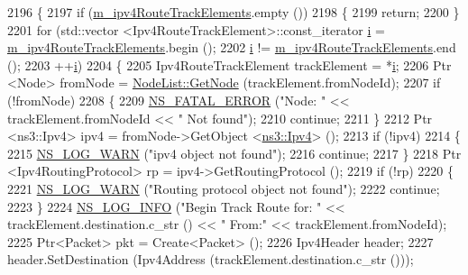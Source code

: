 \begin{DoxyCode}
2196 \{
2197   \textcolor{keywordflow}{if} (\hyperlink{classns3_1_1AnimationInterface_ae34a5934529aba007040aca4fe7ca0fb}{m\_ipv4RouteTrackElements}.empty ())
2198     \{
2199       \textcolor{keywordflow}{return};
2200     \}
2201   \textcolor{keywordflow}{for} (std::vector <Ipv4RouteTrackElement>::const\_iterator \hyperlink{bernuolliDistribution_8m_a6f6ccfcf58b31cb6412107d9d5281426}{i} = 
      \hyperlink{classns3_1_1AnimationInterface_ae34a5934529aba007040aca4fe7ca0fb}{m\_ipv4RouteTrackElements}.begin ();
2202        \hyperlink{bernuolliDistribution_8m_a6f6ccfcf58b31cb6412107d9d5281426}{i} != \hyperlink{classns3_1_1AnimationInterface_ae34a5934529aba007040aca4fe7ca0fb}{m\_ipv4RouteTrackElements}.end ();
2203        ++\hyperlink{bernuolliDistribution_8m_a6f6ccfcf58b31cb6412107d9d5281426}{i})
2204     \{
2205       Ipv4RouteTrackElement trackElement = *\hyperlink{bernuolliDistribution_8m_a6f6ccfcf58b31cb6412107d9d5281426}{i};
2206       Ptr <Node> fromNode = \hyperlink{classns3_1_1NodeList_a80ac09977d48d29db5c704ac8483cf6c}{NodeList::GetNode} (trackElement.fromNodeId);
2207       \textcolor{keywordflow}{if} (!fromNode)
2208         \{
2209           \hyperlink{group__fatal_ga5131d5e3f75d7d4cbfd706ac456fdc85}{NS\_FATAL\_ERROR} (\textcolor{stringliteral}{"Node: "} << trackElement.fromNodeId << \textcolor{stringliteral}{" Not found"});
2210           \textcolor{keywordflow}{continue};
2211         \}
2212       Ptr <ns3::Ipv4> ipv4 = fromNode->GetObject <\hyperlink{classns3_1_1Ipv4}{ns3::Ipv4}> ();
2213       \textcolor{keywordflow}{if} (!ipv4)
2214         \{
2215           \hyperlink{group__logging_gade7208b4009cdf0e25783cd26766f559}{NS\_LOG\_WARN} (\textcolor{stringliteral}{"ipv4 object not found"});
2216           \textcolor{keywordflow}{continue};
2217         \}
2218       Ptr <Ipv4RoutingProtocol> rp = ipv4->GetRoutingProtocol ();
2219       \textcolor{keywordflow}{if} (!rp)
2220         \{
2221           \hyperlink{group__logging_gade7208b4009cdf0e25783cd26766f559}{NS\_LOG\_WARN} (\textcolor{stringliteral}{"Routing protocol object not found"});
2222           \textcolor{keywordflow}{continue};
2223         \}
2224       \hyperlink{group__logging_gafbd73ee2cf9f26b319f49086d8e860fb}{NS\_LOG\_INFO} (\textcolor{stringliteral}{"Begin Track Route for: "} << trackElement.destination.c\_str () << \textcolor{stringliteral}{" From:"} <<
       trackElement.fromNodeId);
2225       Ptr<Packet> pkt = Create<Packet> ();
2226       Ipv4Header header;
2227       header.SetDestination (Ipv4Address (trackElement.destination.c\_str ()));

\end{DoxyCode}
